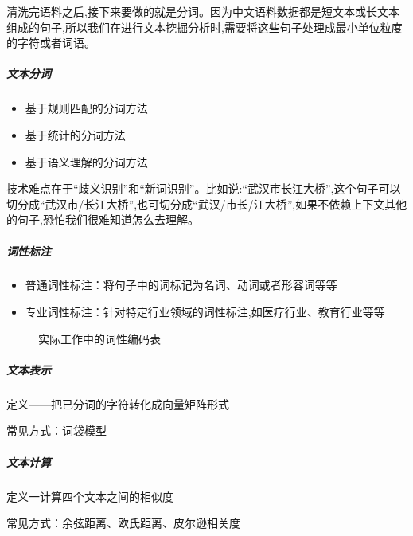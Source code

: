 \documentclass[letterpaper,10pt,english]{sphinxmanual}
\begin{document}
清洗完语料之后,接下来要做的就是分词。因为中文语料数据都是短文本或长文本组成的句子,所以我们在进行文本挖掘分析时,需要将这些句子处理成最小单位粒度的字符或者词语。


\subparagraph{文本分词}
\label{\detokenize{chapter_AI_dive/NLP:id14}}\begin{itemize}
\item {} 
基于规则匹配的分词方法

\item {} 
基于统计的分词方法

\item {} 
基于语义理解的分词方法

\end{itemize}

技术难点在于“歧义识别”和“新词识别”。比如说:“武汉市长江大桥”,这个句子可以切分成“武汉市/长江大桥”,也可切分成“武汉/市长/江大桥”,如果不依赖上下文其他的句子,恐怕我们很难知道怎么去理解。


\subparagraph{词性标注}
\label{\detokenize{chapter_AI_dive/NLP:id15}}\begin{itemize}
\item {} 
普通词性标注：将句子中的词标记为名词、动词或者形容词等等

\item {} 
专业词性标注：针对特定行业领域的词性标注,如医疗行业、教育行业等等

\end{itemize}

\begin{figure}[H]
\centering
\capstart

\noindent{}
\caption{实际工作中的词性编码表}\label{\detokenize{chapter_AI_dive/NLP:id23}}\end{figure}


\subparagraph{文本表示}
\label{\detokenize{chapter_AI_dive/NLP:id16}}
定义——把已分词的字符转化成向量矩阵形式

常见方式：词袋模型


\subparagraph{文本计算}
\label{\detokenize{chapter_AI_dive/NLP:id17}}
定义一计算四个文本之间的相似度

常见方式：余弦距离、欧氏距离、皮尔逊相关度
\end{document}
